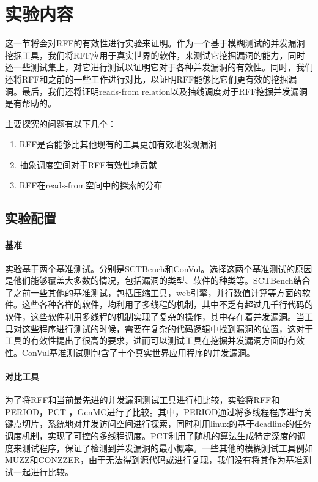 \section{实验内容}

这一节将会对RFF的有效性进行实验来证明。作为一个基于模糊测试的并发漏洞挖掘工具，我们将RFF应用于真实世界的软件，来测试它挖掘漏洞的能力，同时还一些测试集上，对它进行测试以证明它对于各种并发漏洞的有效性。同时，我们还将RFF和之前的一些工作进行对比，以证明RFF能够比它们更有效的挖掘漏洞。最后，我们还将证明reads-from relation以及抽线调度对于RFF挖掘并发漏洞是有帮助的。

主要探究的问题有以下几个：

\begin{enumerate}
\item RFF是否能够比其他现有的工具更加有效地发现漏洞
\item 抽象调度空间对于RFF有效性地贡献
\item RFF在reads-from空间中的探索的分布
\end{enumerate}

\subsection{实验配置}

\paragraph{基准}实验基于两个基准测试。分别是SCTBench和ConVul。选择这两个基准测试的原因是他们能够覆盖大多数的情况，包括漏洞的类型、软件的种类等。SCTBench结合了之前一些其他的基准测试，包括压缩工具，web引擎，并行数值计算等方面的软件。这些各种各样的软件，均利用了多线程的机制，其中不乏有超过几千行代码的软件，这些软件利用多线程的机制实现了复杂的操作，其中存在着并发漏洞。当工具对这些程序进行测试的时候，需要在复杂的代码逻辑中找到漏洞的位置，这对于工具的有效性提出了很高的要求，进而可以测试工具在挖掘并发漏洞方面的有效性。ConVul基准测试则包含了十个真实世界应用程序的并发漏洞。

\paragraph{对比工具}为了将RFF和当前最先进的并发漏洞测试工具进行相比较，实验将RFF和PERIOD，PCT ，GenMC进行了比较。其中，PERIOD通过将多线程程序进行关键点切片，系统地对并发访问空间进行探索，同时利用linux的基于deadline的任务调度机制，实现了可控的多线程调度。PCT利用了随机的算法生成特定深度的调度来测试程序，保证了检测到并发漏洞的最小概率。一些其他的模糊测试工具例如MUZZ和CONZZER，由于无法得到源代码或进行复现，我们没有将其作为基准测试一起进行比较。

